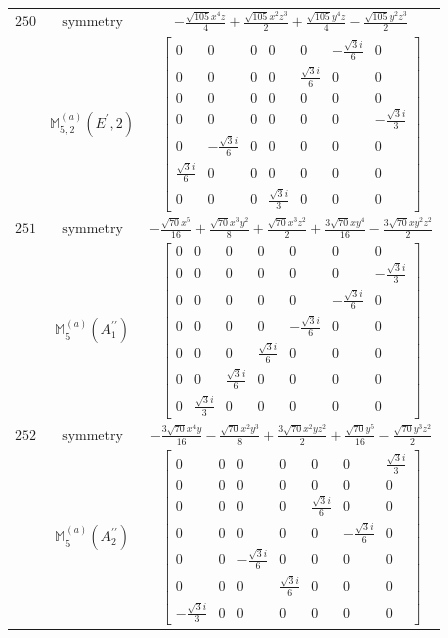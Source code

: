 \documentclass[fleqn,8pt,landscape]{jsarticle}
\begin{document}
\begin{longtable}{ccc}
$ 250 $ & $ \text{symmetry} $ & $ - \frac{\sqrt{105} x^{4} z}{4} + \frac{\sqrt{105} x^{2} z^{3}}{2} + \frac{\sqrt{105} y^{4} z}{4} - \frac{\sqrt{105} y^{2} z^{3}}{2} $ \\
$  $ & $ \mathbb{M}_{5,2}^{(a)}(E^{\prime},2) $ & $ \begin{bmatrix} 0 & 0 & 0 & 0 & 0 & - \frac{\sqrt{3} i}{6} & 0 \\ 0 & 0 & 0 & 0 & \frac{\sqrt{3} i}{6} & 0 & 0 \\ 0 & 0 & 0 & 0 & 0 & 0 & 0 \\ 0 & 0 & 0 & 0 & 0 & 0 & - \frac{\sqrt{3} i}{3} \\ 0 & - \frac{\sqrt{3} i}{6} & 0 & 0 & 0 & 0 & 0 \\ \frac{\sqrt{3} i}{6} & 0 & 0 & 0 & 0 & 0 & 0 \\ 0 & 0 & 0 & \frac{\sqrt{3} i}{3} & 0 & 0 & 0 \end{bmatrix} $ \\ \hline
$ 251 $ & $ \text{symmetry} $ & $ - \frac{\sqrt{70} x^{5}}{16} + \frac{\sqrt{70} x^{3} y^{2}}{8} + \frac{\sqrt{70} x^{3} z^{2}}{2} + \frac{3 \sqrt{70} x y^{4}}{16} - \frac{3 \sqrt{70} x y^{2} z^{2}}{2} $ \\
$  $ & $ \mathbb{M}_{5}^{(a)}(A_{1}^{\prime\prime}) $ & $ \begin{bmatrix} 0 & 0 & 0 & 0 & 0 & 0 & 0 \\ 0 & 0 & 0 & 0 & 0 & 0 & - \frac{\sqrt{3} i}{3} \\ 0 & 0 & 0 & 0 & 0 & - \frac{\sqrt{3} i}{6} & 0 \\ 0 & 0 & 0 & 0 & - \frac{\sqrt{3} i}{6} & 0 & 0 \\ 0 & 0 & 0 & \frac{\sqrt{3} i}{6} & 0 & 0 & 0 \\ 0 & 0 & \frac{\sqrt{3} i}{6} & 0 & 0 & 0 & 0 \\ 0 & \frac{\sqrt{3} i}{3} & 0 & 0 & 0 & 0 & 0 \end{bmatrix} $ \\ \hline
$ 252 $ & $ \text{symmetry} $ & $ - \frac{3 \sqrt{70} x^{4} y}{16} - \frac{\sqrt{70} x^{2} y^{3}}{8} + \frac{3 \sqrt{70} x^{2} y z^{2}}{2} + \frac{\sqrt{70} y^{5}}{16} - \frac{\sqrt{70} y^{3} z^{2}}{2} $ \\
$  $ & $ \mathbb{M}_{5}^{(a)}(A_{2}^{\prime\prime}) $ & $ \begin{bmatrix} 0 & 0 & 0 & 0 & 0 & 0 & \frac{\sqrt{3} i}{3} \\ 0 & 0 & 0 & 0 & 0 & 0 & 0 \\ 0 & 0 & 0 & 0 & \frac{\sqrt{3} i}{6} & 0 & 0 \\ 0 & 0 & 0 & 0 & 0 & - \frac{\sqrt{3} i}{6} & 0 \\ 0 & 0 & - \frac{\sqrt{3} i}{6} & 0 & 0 & 0 & 0 \\ 0 & 0 & 0 & \frac{\sqrt{3} i}{6} & 0 & 0 & 0 \\ - \frac{\sqrt{3} i}{3} & 0 & 0 & 0 & 0 & 0 & 0 \end{bmatrix} $ \\ \hline

\end{longtable}
\end{document}
